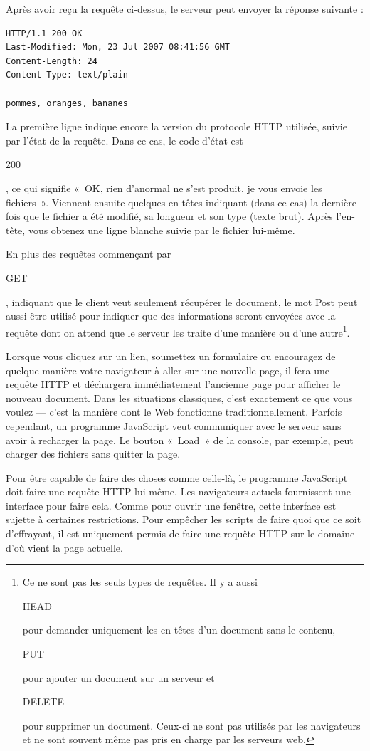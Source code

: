 \documentclass{FramateX}
\renewcommand{\texttt}[1]{\begin{sffamily}{#1}\end{sffamily}}
\begin{document}
Après avoir reçu la requête ci-dessus, le serveur peut envoyer la
réponse suivante :

\begin{lstlisting}
HTTP/1.1 200 OK
Last-Modified: Mon, 23 Jul 2007 08:41:56 GMT
Content-Length: 24
Content-Type: text/plain

pommes, oranges, bananes
\end{lstlisting}
La première ligne indique encore la version du protocole HTTP utilisée,
suivie par l'état de la requête. Dans ce cas, le code d'état est
\texttt{200}, ce qui signifie «~OK, rien d'anormal ne s'est produit, je
vous envoie les fichiers~». Viennent ensuite quelques en-têtes indiquant
(dans ce cas) la dernière fois que le fichier a été modifié, sa longueur
et son type (texte brut). Après l'en-tête, vous obtenez une ligne
blanche suivie par le fichier lui-même.

En plus des requêtes commençant par \texttt{GET}, indiquant que le
client veut seulement récupérer le document, le mot Post peut aussi être
utilisé pour indiquer que des informations seront envoyées avec la
requête dont on attend que le serveur les traite d'une manière ou d'une
autre\footnote{Ce ne sont pas les seuls types de requêtes. Il y a aussi \texttt{HEAD} pour demander uniquement les en-têtes d'un document sans le contenu, \texttt{PUT} pour ajouter un document sur un serveur et \texttt{DELETE} pour supprimer un document. Ceux-ci ne sont pas utilisés par les navigateurs et ne sont souvent même pas pris en charge par les serveurs web.}.

\begin{center}\end{center}

Lorsque vous cliquez sur un lien, soumettez un formulaire ou encouragez
de quelque manière votre navigateur à aller sur une nouvelle page, il
fera une requête HTTP et déchargera immédiatement l'ancienne page pour
afficher le nouveau document. Dans les situations classiques, c'est
exactement ce que vous voulez --- c'est la manière dont le Web
fonctionne traditionnellement. Parfois cependant, un programme
JavaScript veut communiquer avec le serveur sans avoir à recharger la
page. Le bouton «~Load~» de la console, par exemple, peut charger des
fichiers sans quitter la page.

Pour être capable de faire des choses comme celle-là, le programme
JavaScript doit faire une requête HTTP lui-même. Les navigateurs actuels
fournissent une interface pour faire cela. Comme pour ouvrir une
fenêtre, cette interface est sujette à certaines restrictions. Pour
empêcher les scripts de faire quoi que ce soit d'effrayant, il est
uniquement permis de faire une requête HTTP sur le domaine d'où vient la
page actuelle.
\end{document}
